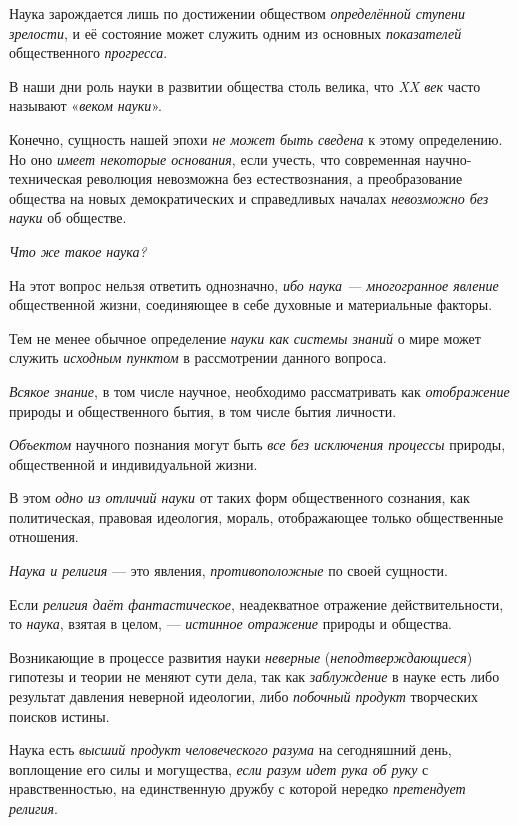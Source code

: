 \documentclass[a4paper,14pt,russian]{extreport}
\begin{document}
Наука зарождается лишь по достижении обществом \emph{определённой ступени зрелости}, и её состояние может служить одним из основных \emph{показателей} общественного \emph{прогресса}.

В наши дни роль науки в развитии общества столь велика, что \emph{XX век} часто называют «\emph{веком науки}».

Конечно, сущность нашей эпохи \emph{не может быть сведена} к этому определению. Но оно \emph{имеет некоторые основания}, если учесть, что современная научно-техническая революция невозможна без естествознания, а преобразование общества на новых демократических и справедливых началах \emph{невозможно без науки} об обществе.

\emph{Что же такое наука?}

На этот вопрос нельзя ответить однозначно, \emph{ибо наука --- многогранное явление} общественной жизни, соединяющее в себе духовные и материальные факторы.

Тем не менее обычное определение \emph{науки как} \emph{системы знаний} о мире может служить \emph{исходным пунктом} в рассмотрении данного вопроса.

\emph{Всякое знание}, в том числе научное, необходимо рассматривать как \emph{отображение} природы и общественного бытия, в том числе бытия личности.

\emph{Объектом} научного познания могут быть \emph{все без исключения процессы} природы, общественной и индивидуальной жизни.

В этом \emph{одно из отличий науки} от таких форм общественного сознания, как политическая, правовая идеология, мораль, отображающее только общественные отношения.

\emph{Наука и религия} --- это явления, \emph{противоположные} по своей сущности.

Если \emph{религия даёт фантастическое}, неадекватное отражение действительности, то \emph{наука}, взятая в целом, --- \emph{истинное отражение} природы и общества.

Возникающие в процессе развития науки \emph{неверные} (\emph{неподтверждающиеся}) гипотезы и теории не меняют сути дела, так как \emph{заблуждение} в науке есть либо результат давления неверной идеологии, либо \emph{побочный продукт} творческих поисков истины.

Наука есть \emph{высший продукт} \emph{человеческого разума} на сегодняшний день, воплощение его силы и могущества, \emph{если разум идет рука об руку} с нравственностью, на единственную дружбу с которой нередко \emph{претендует религия}.
\end{document}
